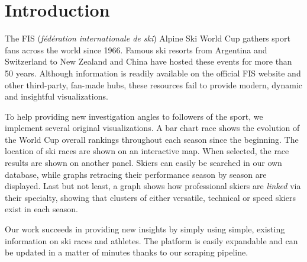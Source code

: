 \tableofcontents

\vspace*{3cm}

\section*{Introduction}

The FIS (\textit{fédération internationale de ski}) Alpine Ski World Cup gathers sport fans across the world since 1966.
Famous ski resorts from Argentina and Switzerland to New Zealand and China have hosted these events for more than 50 years.
Although information is readily available on the official FIS website\cite{fis-website} and other third-party, fan-made hubs,\cite{ski-db, ski-reference} these resources fail to provide modern, dynamic and insightful visualizations.

To help providing new investigation angles to followers of the sport, we implement several original visualizations.
A bar chart race shows the evolution of the World Cup overall rankings throughout each season since the beginning.
The location of ski races are shown on an interactive map.
When selected, the race results are shown on another panel.
Skiers can easily be searched in our own database, while graphs retracing their performance season by season are displayed.
Last but not least, a graph shows how professional skiers are \textit{linked} via their specialty, showing that clusters of either versatile, technical or speed skiers exist in each season.

Our work succeeds in providing new insights by simply using simple, existing information on ski races and athletes.
The platform is easily expandable and can be updated in a matter of minutes thanks to our scraping pipeline.

\newpage
